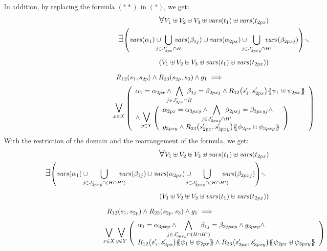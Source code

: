 \documentclass[runningheads]{llncs}
\begin{document}
\begin{enumerate}
In addition, by replacing the formula $(**)$ in $(*)$, we get: 
\begin{multline*}
\everymath{\displaystyle}
\bigforall V_1 \uplus V_2 \uplus V_3 \uplus \fvars{t_1}\uplus \fvars{t_{2px}}\\ 
\bigexists  \mpar{\fvars{\alpha_{1}}  \cup \!\!\!\!\!\!\bigcup_{j \in J'_{2px} \cap H} \!\!\!\!\!\!\!\fvars{\beta_{1j}}  \cup \fvars{\alpha_{2px}}  \cup \!\!\!\!\!\!\bigcup_{j \in J'_{3pxy} \cap H'} \!\!\!\!\!\!\!\fvars{\beta_{2pxj}}}  \setminus \\ \mpar{V_1 \uplus V_2 \uplus V_3 \uplus \fvars{t_1}\uplus \fvars{t_{2px}}}  \\
R_{12}\mpar{s_1, s_{2p}} \wedge R_{23}\mpar{s_{2p},s_3} \wedge g_1 \implies \hspace{4.5cm}\\\operatorname*{\bigsymb{\bigvee}}_{x \in X} \mpar{\everymath{\displaystyle}
\begin{array}{l}
			\alpha_1 = \alpha_{2px} \wedge \bigwedge_\subbox{j \in J'_{2px} \cap H} \beta_{1j} = \beta_{2pxj}  \wedge R_{12}\mpar{s'_1, s'_{2px}}\psubst{\psi_1 \uplus \psi_{2px}} \\ 
\land
		\operatorname*{\bigsymb{\bigvee}}_{y \in Y} \mpar{\everymath{\displaystyle}
\begin{array}{l}
			 \alpha_{2px}=\alpha_{3pxy} \wedge \bigwedge_\subbox{j \in J'_{3pxy} \cap H'} \beta_{2pxj}=\beta_{3pxyj} \nwedge\\
			 g_{3pxy} \wedge R_{23}\mpar{s'_{2px}, s'_{3pxy}}\psubst{\psi_{2px} \uplus \psi_{3pxy}}
		\end{array}}	
		\end{array}} 
\end{multline*}		
With the restriction of the domain and the rearrangement of the formula, we get:
\begin{multline*}
\everymath{\displaystyle}
\bigforall V_1 \uplus V_2 \uplus V_3 \uplus \fvars{t_1}\uplus \fvars{t_{2px}}\\ \bigexists  \mpar{\fvars{\alpha_{1}}  \cup \!\!\!\!\!\!\bigcup_{j \in J'_{3pxy} \cap (H\cap H')} \!\!\!\!\!\!\!\fvars{\beta_{1j}}  \cup \fvars{\alpha_{2px}}  \cup \!\!\!\!\!\!\bigcup_{j \in J'_{3pxy} \cap (H\cap H')} \!\!\!\!\!\!\!\fvars{\beta_{2pxj}}}  \setminus \hspace{6cm}\\ \mpar{V_1 \uplus V_2 \uplus V_3 \uplus \fvars{t_1}\uplus \fvars{t_{2px}}}  \\
R_{12}\mpar{s_1, s_{2p}} \wedge R_{23}\mpar{s_{2p},s_3} \wedge g_1 \implies 
\hspace{5.5cm}\\
\operatorname*{\bigsymb{\bigvee}}_{x \in X} 
\operatorname*{\bigsymb{\bigvee}}_{y \in Y}
\mpar{\everymath{\displaystyle}
\begin{array}{l}
\alpha_1=\alpha_{3pxy}\wedge \bigwedge_\subbox{j \in J'_{3pxy} \cap (H\cap H')} \beta_{1j}=\beta_{3jpxy} \wedge g_{3pxy}\wedge \\
R_{12}\mpar{s'_1, s'_{2px}}\psubst{\psi_1 \uplus \psi_{2px}} \wedge R_{23}\mpar{s'_{2px}, s'_{3pxy}}\psubst{\psi_{2px} \uplus \psi_{3pxy}}
\end{array}}
\end{multline*}	


\end{enumerate}
\end{document}
